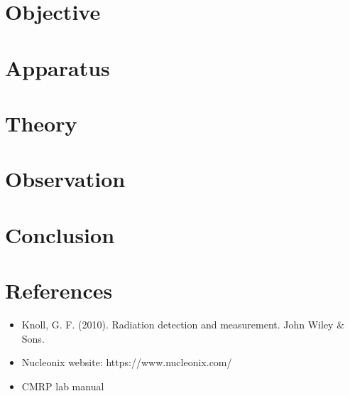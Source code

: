 \documentclass[a4paper]{article}
\begin{document}
 \newpage
{\hypersetup{linkcolor=black} %
\tableofcontents\thispagestyle{empty}}
\newpage
{}
\section{Objective}

\section{Apparatus}

\section{Theory}

\section{Observation}

\section{Conclusion}

% 
% 
\section{References}
\begin{itemize}
    \item Knoll, G. F. (2010). Radiation detection and measurement. John Wiley \& Sons.
    \item Nucleonix website: https://www.nucleonix.com/
    \item CMRP lab manual
\end{itemize}
\end{document}
